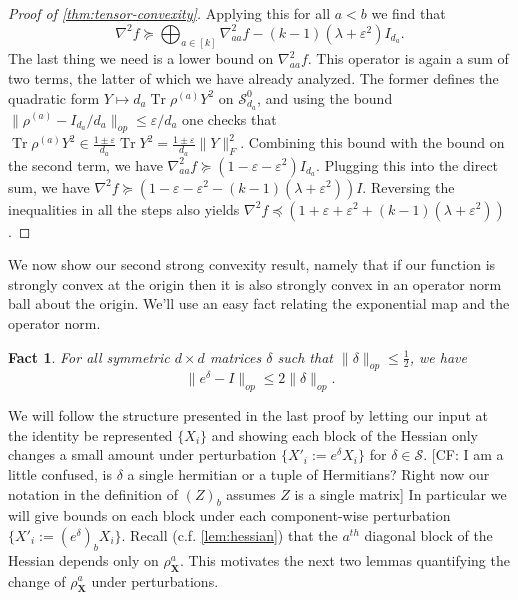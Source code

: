 \documentclass{article}
\newtheorem{fact}[theorem]{Fact}
\renewcommand{\vec}{\bm}
\newcommand\eps{\varepsilon}
\newcommand\Sym{\mathcal{S}}
\newcommand\tr{\operatorname{Tr}}
\newcommand{\CF}[1]{{\color{purple}[CF: #1]}}
\begin{document}
\begin{proof}[Proof of \cref{thm:tensor-convexity}]
 Applying this for all $a < b$ we find that 
 $$\nabla^2 f  \succeq \bigoplus_{a \in [k]} \nabla^2_{aa} f - (k - 1) (\lambda + \eps^2) I_{d_a}.$$ 
The last thing we need is a lower bound on $\nabla^2_{aa} f.$ This operator is again a sum of two terms, the latter of which we have already analyzed. The former defines the quadratic form $Y \mapsto d_a \tr \rho^{(a)} Y^2$ on $\Sym^0_{d_a}$, and using the bound $\|\rho^{(a)} - I_{d_a}/{d_a}\|_{op} \leq \eps/d_a$ one checks that $\tr \rho^{(a)} Y^2 \in \frac{1 \pm \eps }{d_a} \tr Y^2 = \frac{1 \pm \eps }{d_a} \|Y\|_{F}^2. $ Combining this bound with the bound on the second term, we have $\nabla^2_{aa} f \succeq (1 -  \eps  - \eps^2 ) I_{d_a}$. Plugging this into the direct sum, we have $\nabla^2 f \succeq (1  - \eps - \eps^2  - (k - 1) (\lambda + \eps^2)) I$. Reversing the inequalities in all the steps also yields $\nabla^2 f \preceq (1  + \eps + \eps^2  + (k - 1) (\lambda + \eps^2))$.
\end{proof}





We now show our second strong convexity result, namely that if our function is strongly convex at the origin then it is also strongly convex in an operator norm ball about the origin. We'll use an easy fact relating the exponential map and the operator norm.

\begin{fact} For all symmetric $d\times d$ matrices $\delta $ such that $ \|\delta\|_{op} \leq \frac{1}{2}$, we have $$ \|e^{\delta} - I\|_{op} \leq 2 \|\delta\|_{op}.$$   \end{fact}

We will follow the structure presented in the last proof by letting our input at the identity be represented $\{X_{i}\}$ and showing each block of the Hessian only changes a small amount under perturbation $\{X'_{i} := e^{\delta} X_{i}\}$ for $\delta \in \Sym$. \CF{ I am a little confused, is $\delta$ a single hermitian or a tuple of Hermitians? Right now our notation in the definition of $(Z)_{b}$ assumes $Z$ is a single matrix} In particular we will give bounds on each block under each component-wise perturbation $\{X'_{i} := (e^{\delta})_{b} X_{i}\}$. Recall (c.f. \cref{lem:hessian}) that the $a^{th}$ diagonal block of the Hessian depends only on $\rho^a_{\vec X}$. This motivates the next two lemmas quantifying the change of $\rho^{a}
_{\vec X}$ under perturbations. 
\end{document}
